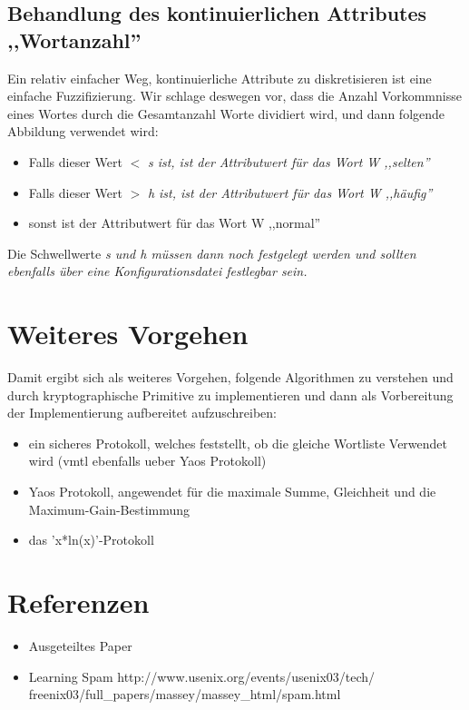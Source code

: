 \documentclass[12pt]{article}
\begin{document}
\subsection{Behandlung des kontinuierlichen Attributes ,,Wortanzahl''}
Ein relativ einfacher Weg, kontinuierliche Attribute zu diskretisieren ist eine
einfache Fuzzifizierung. Wir schlage deswegen vor, dass die Anzahl Vorkommnisse
eines Wortes durch die Gesamtanzahl Worte dividiert wird, und dann folgende
Abbildung verwendet wird:
\begin{itemize}
 \item Falls dieser Wert $<$ \em{s} ist, ist der Attributwert f\"ur das Wort W ,,selten''
 \item Falls dieser Wert $>$ \em{h} ist, ist der Attributwert f\"ur das Wort W ,,h\"aufig''
 \item sonst ist der Attributwert f\"ur das Wort W ,,normal''
\end{itemize}
Die Schwellwerte \em{s} und \em{h} m\"ussen dann noch festgelegt werden und
sollten ebenfalls \"uber eine Konfigurationsdatei festlegbar sein.

\section{Weiteres Vorgehen}
Damit ergibt sich als weiteres Vorgehen, folgende Algorithmen zu verstehen
und durch kryptographische Primitive zu implementieren und dann als Vorbereitung
der Implementierung aufbereitet aufzuschreiben:
\begin{itemize}
 \item ein sicheres Protokoll, welches feststellt, ob die gleiche Wortliste
       Verwendet wird (vmtl ebenfalls ueber Yaos Protokoll)
 \item Yaos Protokoll, angewendet f\"ur die maximale Summe, Gleichheit und 
   die Maximum-Gain-Bestimmung
 \item das 'x*ln(x)'-Protokoll
\end{itemize}

\section{Referenzen}
\begin{itemize}
\item Ausgeteiltes Paper
\item Learning Spam http://www.usenix.org/events/usenix03/tech/\\
      freenix03/full\_papers/massey/massey\_html/spam.html
\end{itemize}
\end{document}
